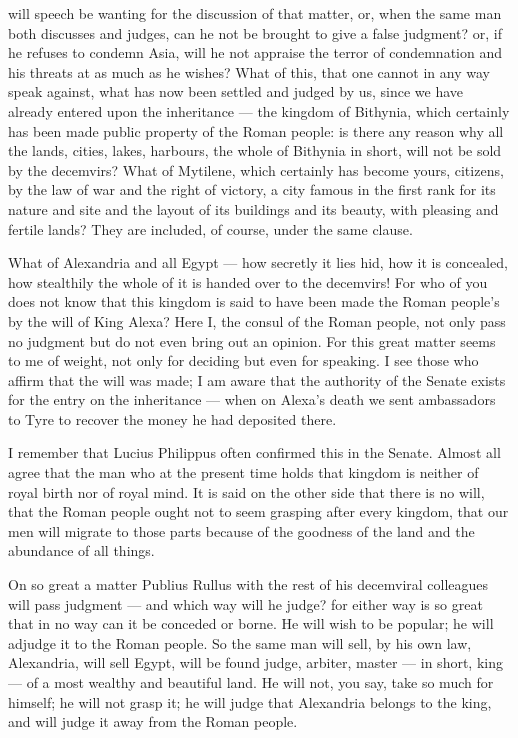  will speech be wanting for the discussion of that matter, or, when the same man both discusses and judges, can he not be brought to give a false judgment? or, if he refuses to condemn Asia, will he not appraise the terror of condemnation and his threats at as much as he wishes? What of this, that one cannot in any way speak against, what has now been settled and judged by us, since we have already entered upon the inheritance --- the kingdom of Bithynia, which certainly has been made public property of the Roman people: is there any reason why all the lands, cities, lakes, harbours, the whole of Bithynia in short, will not be sold by the decemvirs? What of Mytilene, which certainly has become yours, citizens, by the law of war and the right of victory, a city famous in the first rank for its nature and site and the layout of its buildings and its beauty, with pleasing and fertile lands? They are included, of course, under the same clause.

 What of Alexandria and all Egypt --- how secretly it lies hid, how it is concealed, how stealthily the whole of it is handed over to the decemvirs! For who of you does not know that this kingdom is said to have been made the Roman people's by the will of King Alexa? Here I, the consul of the Roman people, not only pass no judgment but do not even bring out an opinion. For this great matter seems to me of weight, not only for deciding but even for speaking. I see those who affirm that the will was made; I am aware that the authority of the Senate exists for the entry on the inheritance --- when on Alexa's death we sent ambassadors to Tyre to recover the money he had deposited there.

 I remember that Lucius Philippus often confirmed this in the Senate. Almost all agree that the man who at the present time holds that kingdom is neither of royal birth nor of royal mind. It is said on the other side that there is no will, that the Roman people ought not to seem grasping after every kingdom, that our men will migrate to those parts because of the goodness of the land and the abundance of all things.

 On so great a matter Publius Rullus with the rest of his decemviral colleagues will pass judgment --- and which way will he judge? for either way is so great that in no way can it be conceded or borne. He will wish to be popular; he will adjudge it to the Roman people. So the same man will sell, by his own law, Alexandria, will sell Egypt, will be found judge, arbiter, master --- in short, king --- of a most wealthy and beautiful land. He will not, you say, take so much for himself; he will not grasp it; he will judge that Alexandria belongs to the king, and will judge it away from the Roman people.


